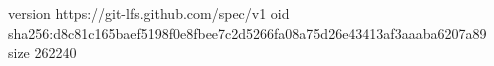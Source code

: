 version https://git-lfs.github.com/spec/v1
oid sha256:d8c81c165baef5198f0e8fbee7c2d5266fa08a75d26e43413af3aaaba6207a89
size 262240
